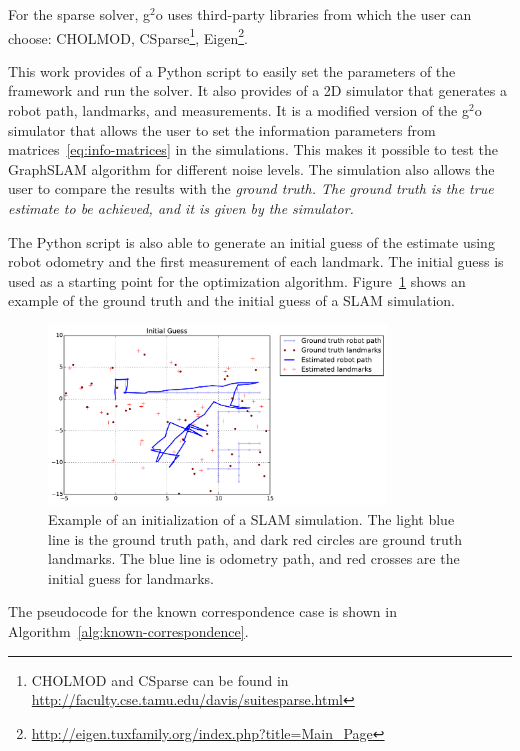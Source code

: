 For the sparse solver, g$^2$o uses third-party libraries from which the user can choose: CHOLMOD, CSparse\footnote{CHOLMOD and CSparse can be found in \url{http://faculty.cse.tamu.edu/davis/suitesparse.html}}, Eigen\footnote{\url{http://eigen.tuxfamily.org/index.php?title=Main_Page}}. 

This work provides of a Python script to easily set the parameters of the framework and run the solver. It also provides of a 2D simulator that generates a robot path, landmarks, and measurements. It is a modified version of the g$^2$o simulator that allows the user to set the information parameters from matrices~\eqref{eq:info-matrices} in the simulations. This makes it possible to test the GraphSLAM algorithm for different noise levels. The simulation also allows the user to compare the results with the \it{ground truth}. The ground truth is the true estimate to be achieved, and it is given by the simulator. 

The Python script is also able to generate an initial guess of the estimate using robot odometry and the first measurement of each landmark. The initial guess is used as a starting point for the optimization algorithm. Figure~\ref{fig:simulation} shows an example of the ground truth and the initial guess of a SLAM simulation.

\begin{figure}[htbp!]
    \centering
    \includegraphics[width=0.8\textwidth]{imagenes/guess_it_20_nl_100_op_100_oa_100_lp_100_ds_100_kw_0.1.pdf}
    \caption[Example of an initialization of a SLAM simulation.]{Example of an initialization of a SLAM simulation. The light blue line is the ground truth path, and dark red circles are ground truth landmarks. The blue line is odometry path, and red crosses are the initial guess for landmarks.}
    \label{fig:simulation}
\end{figure}

The pseudocode for the known correspondence case is shown in Algorithm~\ref{alg:known-correspondence}.

